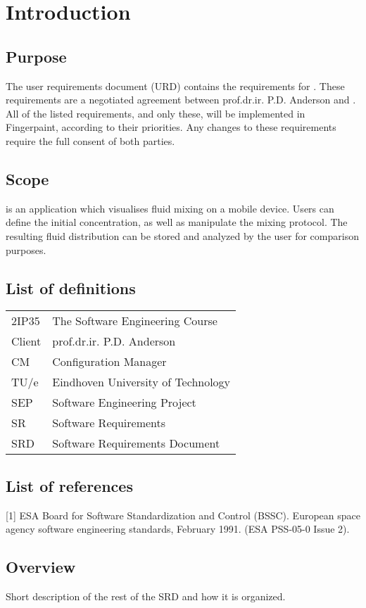 \chapter{Introduction}

\section{Purpose}
The user requirements document (URD) contains the requirements for \projectname. These requirements are a negotiated agreement between prof.dr.ir. P.D. Anderson and \projectauthor. All of the listed requirements, and only these, will be implemented in Fingerpaint, according to their priorities. Any changes to these requirements require the full consent of both parties.

\section{Scope}
\projectname is an application which visualises fluid mixing on a mobile device. Users can define the initial concentration, as well as manipulate the mixing protocol. The resulting fluid distribution can be stored and analyzed by the user for comparison purposes.

\section{List of definitions}
\begin{tabular}{l|l}
2IP35 & The Software Engineering Course \\
Client & prof.dr.ir. P.D. Anderson \\
CM    &Configuration Manager \\
TU/e  &Eindhoven University of Technology \\
SEP   &Software Engineering Project \\
SR    &Software Requirements \\
SRD   &Software Requirements Document \\
\end{tabular}

\section{List of references}


[1] ESA Board for Software Standardization and Control (BSSC). European space agency software
engineering standards, February 1991. (ESA PSS-05-0 Issue 2).


\section{Overview}
Short description of the rest of the SRD and how it is organized.
